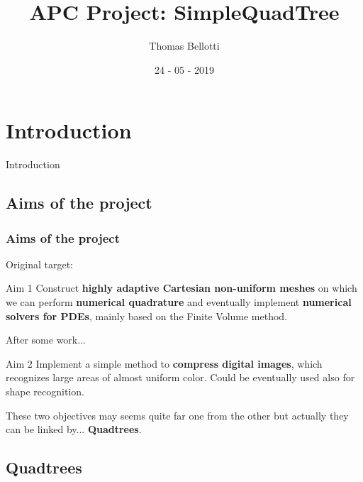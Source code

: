 \documentclass[8pt]{beamer}
\title{APC Project: SimpleQuadTree}
\author{Thomas Bellotti}
\date{24 - 05 - 2019}
\begin{document}
\begin{frame}
 \maketitle
\end{frame}

\begin{frame}
 \tableofcontents
\end{frame}



\section{Introduction}
\begin{frame}
 \begin{center}
  \begin{huge}
   Introduction
  \end{huge}
 \end{center}
\end{frame}

\subsection{Aims of the project}
\begin{frame}
\frametitle{Aims of the project}
\pause
Original target:
\begin{block}{Aim 1}
 Construct \textbf{highly adaptive Cartesian non-uniform meshes} on which we can perform \textbf{numerical quadrature} and eventually implement \textbf{numerical solvers for PDEs}, mainly based on the Finite Volume method.
\end{block}
\pause
After some work...
\begin{block}{Aim 2}
Implement a simple method to \textbf{compress digital images}, which recognizes large areas of almost uniform color. Could be eventually used also for shape recognition. 
\end{block}
\pause

These two objectives may seems quite far one from the other but actually they can be linked by... \textbf{Quadtrees}.
\end{frame}

\subsection{Quadtrees}
\end{document}
